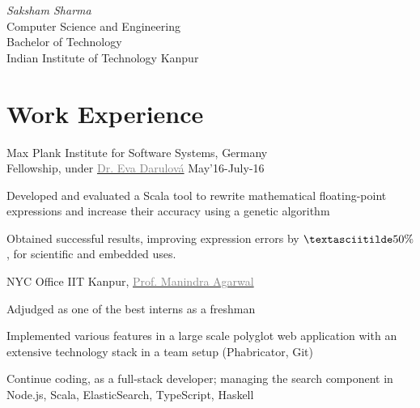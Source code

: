 \documentclass{tccv}
\begin{document}
{ \textit{Saksham \textcolor{myred}{Sharma}}}
\medskip\\
\large{Computer Science and Engineering}\\
\large{Bachelor of Technology}\\
{Indian Institute of Technology Kanpur}

\vspace{-0.5cm}
\section{Work Experience}
\vspace{-0.1cm}
\begin{experience}

  {Max Plank Institute for Software Systems, \small{Germany}\\
  Fellowship, under
  \href{http://www.mpi-sws.org/~eva}{\textcolor{gray}{Dr. Eva
      Darulová}}
  \hfill May'16-July-16}
  {
  \item Developed and evaluated a Scala tool to rewrite
    mathematical floating-point expressions and increase their
    accuracy using a genetic algorithm
  \item Obtained successful results, improving expression errors by
    $\textasciitilde50\%$, for scientific and embedded uses.
  }

  {NYC Office IIT Kanpur,
    \href{http://cse.iitk.ac.in/~manindra}{\textcolor{gray}{Prof. Manindra Agarwal}}}
  {
  \item Adjudged as one of the best interns as a freshman
  \item Implemented various features in a large scale polyglot web
    application with an extensive technology stack in a team setup
    (Phabricator, Git)
  \item Continue coding, as a full-stack developer;
    managing the search component in Node.js, Scala, ElasticSearch,
    TypeScript, Haskell
  }
\end{experience}

\vspace{-0.5cm}
\end{document}
